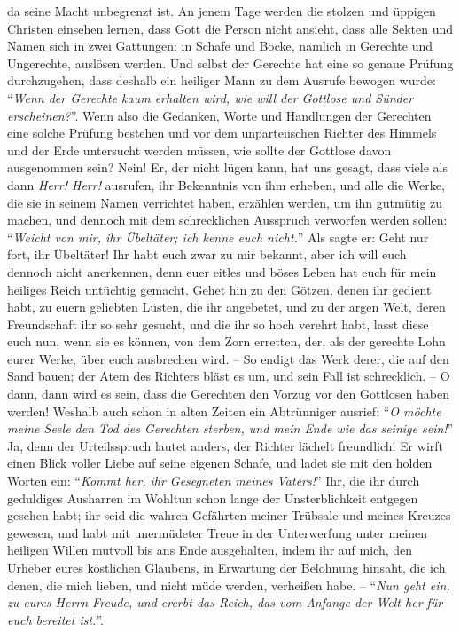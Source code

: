 da seine Macht unbegrenzt ist. 
An jenem Tage werden die stolzen und üppigen Christen einsehen lernen, dass Gott
die Person nicht ansieht,
dass alle Sekten und Namen sich in zwei Gattungen: 
in Schafe und Böcke, nämlich in Gerechte und Ungerechte, auslösen werden.
Und selbst der Gerechte hat eine so genaue Prüfung durchzugehen, dass deshalb ein
heiliger Mann zu dem Ausrufe bewogen wurde: "`\textit{Wenn der Gerechte kaum
erhalten wird, wie will der Gottlose und Sünder erscheinen?}"'.
Wenn also die Gedanken, Worte und Handlungen der Gerechten eine solche Prüfung
bestehen und vor dem unparteiischen Richter des Himmels und der Erde untersucht
werden müssen, wie sollte der Gottlose davon ausgenommen sein?
Nein!
Er, der nicht lügen kann, hat uns gesagt, dass viele als dann \textit{Herr!
Herr!} ausrufen, ihr Bekenntnis von ihm erheben, und alle die Werke, die sie in
seinem Namen verrichtet haben, erzählen werden, um ihn gutmütig zu machen, und dennoch mit dem
schrecklichen Ausspruch verworfen werden sollen:
"`\textit{Weicht von mir, ihr Übeltäter; ich kenne euch nicht.}"'
Als sagte er:
Geht nur fort, ihr Übeltäter!
Ihr habt euch zwar zu mir bekannt,
aber ich will euch dennoch nicht anerkennen,
denn euer eitles und böses Leben hat euch für mein heiliges Reich untüchtig
gemacht.
Gehet hin zu den Götzen, denen ihr gedient habt,
zu euern geliebten Lüsten, die ihr angebetet, und zu der argen Welt, deren
Freundschaft ihr so sehr gesucht, und die ihr so hoch verehrt habt,
lasst diese euch nun, wenn sie es können, von dem Zorn erretten, der, als der
gerechte Lohn eurer Werke, über euch ausbrechen wird.
-- So endigt das Werk derer, die auf den Sand bauen;
der Atem des Richters bläst es um, und sein Fall ist schrecklich.
-- O dann, dann wird es sein, dass die Gerechten den Vorzug vor den Gottlosen
haben werden!
Weshalb auch schon in alten Zeiten ein Abtrünniger ausrief:
"`\textit{O möchte meine Seele den Tod des Gerechten sterben, und mein Ende wie
das seinige sein!}"'
Ja, denn der Urteilsspruch lautet anders,
der Richter lächelt freundlich!
Er wirft einen Blick voller Liebe auf seine eigenen Schafe, und ladet sie mit
den holden Worten ein:
"`\textit{Kommt her, ihr Gesegneten meines Vaters!}"'
Ihr, die ihr durch geduldiges Ausharren im Wohltun schon lange der
Unsterblichkeit entgegen gesehen habt;
ihr seid die wahren Gefährten meiner Trübsale und meines Kreuzes gewesen, und
habt mit unermüdeter Treue in der Unterwerfung unter meinen heiligen Willen
mutvoll bis ans Ende ausgehalten, indem ihr auf mich, den Urheber eures
köstlichen Glaubens, in Erwartung der Belohnung hinsaht, die ich denen, die
mich lieben, und nicht müde werden, verheißen habe.
-- "`\textit{Nun geht ein, zu eures Herrn Freude, und ererbt das Reich, das
vom Anfange der Welt her für euch bereitet ist.}"'.

